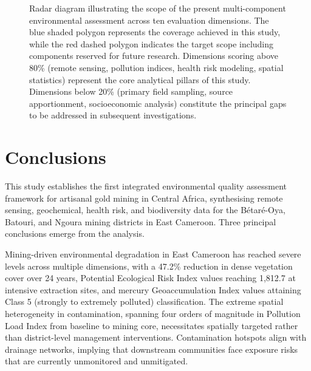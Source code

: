 \documentclass[preprint,12pt,number]{elsarticle}
\begin{document}
\begin{figure}[H]
\caption{Radar diagram illustrating the scope of the present multi-component environmental assessment across ten evaluation dimensions. The blue shaded polygon represents the coverage achieved in this study, while the red dashed polygon indicates the target scope including components reserved for future research. Dimensions scoring above 80\% (remote sensing, pollution indices, health risk modeling, spatial statistics) represent the core analytical pillars of this study. Dimensions below 20\% (primary field sampling, source apportionment, socioeconomic analysis) constitute the principal gaps to be addressed in subsequent investigations.}
\label{fig:radar}
\end{figure}


\section{Conclusions}

This study establishes the first integrated environmental quality assessment framework for artisanal gold mining in Central Africa, synthesising remote sensing, geochemical, health risk, and biodiversity data for the B\'{e}tar\'{e}-Oya, Batouri, and Ngoura mining districts in East Cameroon. Three principal conclusions emerge from the analysis.

Mining-driven environmental degradation in East Cameroon has reached severe levels across multiple dimensions, with a 47.2\% reduction in dense vegetation cover over 24 years, Potential Ecological Risk Index values reaching 1,812.7 at intensive extraction sites, and mercury Geoaccumulation Index values attaining Class 5 (strongly to extremely polluted) classification. The extreme spatial heterogeneity in contamination, spanning four orders of magnitude in Pollution Load Index from baseline to mining core, necessitates spatially targeted rather than district-level management interventions. Contamination hotspots align with drainage networks, implying that downstream communities face exposure risks that are currently unmonitored and unmitigated.
\end{document}
